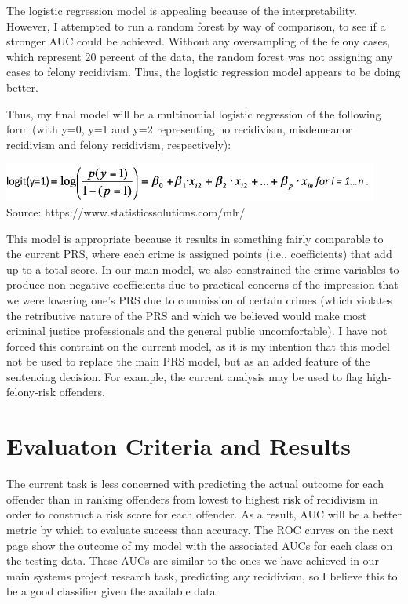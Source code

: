 \documentclass{article}
\begin{document}
The logistic regression model is appealing because of the interpretability. However, I attempted to run a random forest by way of comparison, to see if a stronger AUC could be achieved. Without any oversampling of the felony cases, which represent 20 percent of the data, the random forest was not assigning any cases to felony recidivism. Thus, the logistic regression model appears to be doing better. 

Thus, my final model will be a multinomial logistic regression of the following form (with y=0, y=1 and y=2 representing no recidivism, misdemeanor recidivism and felony recidivism, respectively):

\begin{center}
\includegraphics[scale=0.5]{mult.jpg} 
\linebreak
Source: https://www.statisticssolutions.com/mlr/
\end{center}

This model is appropriate because it results in something fairly comparable to the current PRS, where each crime is assigned points (i.e., coefficients) that add up to a total score. In our main model, we also constrained the crime variables to produce non-negative coefficients due to practical concerns of the impression that we were lowering one's PRS due to commission of certain crimes (which violates the retributive nature of the PRS and which we believed would make most criminal justice professionals and the general public uncomfortable). I have not forced this contraint on the current model, as it is my intention that this model not be used to replace the main PRS model, but as an added feature of the sentencing decision. For example, the current analysis may be used to flag high-felony-risk offenders. 

\section{Evaluaton Criteria and Results}

The current task is less concerned with predicting the actual outcome for each offender than in ranking offenders from lowest to highest risk of recidivism in order to construct a risk score for each offender. As a result, AUC will be a better metric by which to evaluate success than accuracy. The ROC curves on the next page show the outcome of my model with the associated AUCs for each class on the testing data. These AUCs are similar to the ones we have achieved in our main systems project research task, predicting any recidivism, so I believe this to be a good classifier given the available data. 
\end{document}

